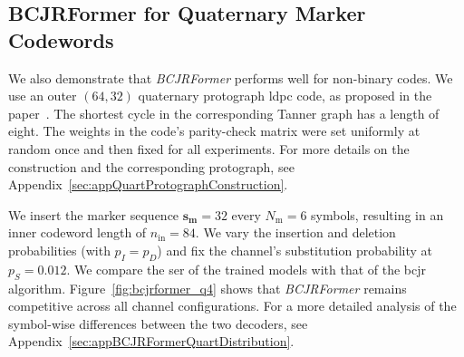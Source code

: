 \documentclass[conference,letterpaperu]{IEEEtran}
\newcommand{\pdel}{\ensuremath{p_D}}
\newcommand{\pins}{\ensuremath{p_I}}
\newcommand{\psub}{\ensuremath{p_S}}
\newcommand{\nin}{\ensuremath{n_{\text{in}}}}
\newcommand{\marker}{\ensuremath{\bm{s_{\text{m}}}}}
\newcommand{\markerFreq}{\ensuremath{N_{\text{m}}}}
\begin{document}
\subsection{BCJRFormer for Quaternary Marker Codewords}
\label{sec:ExperimentBCJRDecoderSingleMarkerQ4}

We also demonstrate that \textit{BCJRFormer} performs well for non-binary codes. We use an outer \((64, 32)\) quaternary protograph \ac{ldpc} code, as proposed in the paper~\cite{maaroufConcatenatedCodesMultiple2023a}. The shortest cycle in the corresponding Tanner graph has a length of eight. The weights in the code's parity-check matrix were set uniformly at random once and then fixed for all experiments. For more details on the construction and the corresponding protograph, see Appendix~\ref{sec:appQuartProtographConstruction}.

We insert the marker sequence $\marker = 32$ every $\markerFreq = 6$ symbols, resulting in an inner codeword length of $\nin = 84$. We vary the insertion and deletion probabilities (with $\pins = \pdel$) and fix the channel's substitution probability at $\psub = 0.012$. We compare the \ac{ser} of the trained models with that of the \ac{bcjr} algorithm. Figure~\ref{fig:bcjrformer_q4} shows that \textit{BCJRFormer} remains competitive across all channel configurations. For a more detailed analysis of the symbol-wise differences between the two decoders, see Appendix~\ref{sec:appBCJRFormerQuartDistribution}.
\end{document}
